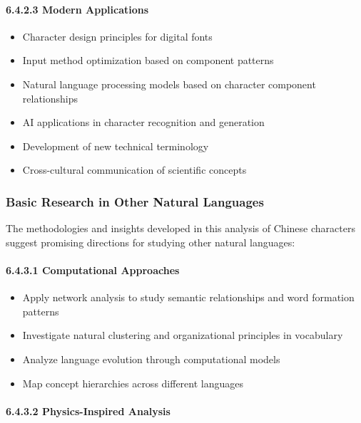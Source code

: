 \documentclass[11pt,letterpaper]{article}
\begin{document}
\paragraph{6.4.2.3 Modern Applications}\label{modern-applications}

\begin{itemize}
\tightlist
\item
  Character design principles for digital fonts
\item
  Input method optimization based on component patterns
\item
  Natural language processing models based on character component
  relationships
\item
  AI applications in character recognition and generation
\item
  Development of new technical terminology
\item
  Cross-cultural communication of scientific concepts
\end{itemize}

\subsubsection{Basic Research in Other Natural Languages}\label{basic-research-in-other-natural-languages}

The methodologies and insights developed in this analysis of Chinese
characters suggest promising directions for studying other natural
languages:

\paragraph{6.4.3.1 Computational Approaches}\label{computational-approaches}

\begin{itemize}
\tightlist
\item
  Apply network analysis to study semantic relationships and word
  formation patterns
\item
  Investigate natural clustering and organizational principles in
  vocabulary
\item
  Analyze language evolution through computational models
\item
  Map concept hierarchies across different languages
\end{itemize}

\paragraph{6.4.3.2 Physics-Inspired
Analysis}\label{physics-inspired-analysis}
\end{document}
